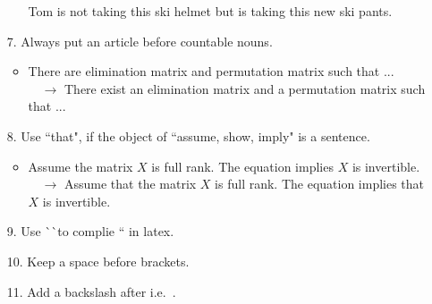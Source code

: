 \documentclass[11pt]{article}
\theoremstyle{plain}
\theoremstyle{definition}
\begin{document}
\begin{enumerate}
\begin{itemize}
    	Tom is not taking this ski helmet but is taking this new ski pants.
    \end{itemize}
    \item[7.] Always put an article before countable nouns. 
    \begin{itemize}
    	\item There are elimination matrix and permutation matrix such that ...\\
    	$\quad \rightarrow $ There exist an elimination matrix and a permutation matrix such that ...
    \end{itemize}
    \item[8.] Use ``that", if the object of ``assume, show, imply" is a sentence.
    \begin{itemize}
    	\item Assume the matrix $X$ is full rank. The equation implies $X$ is invertible.\\
    	$\quad \rightarrow $ Assume that the matrix $X$ is full rank. The equation implies that $X$ is invertible.
    \end{itemize}
    \item[9.] Use \`\ \`\ to complie `` in latex.
    \item[10.] Keep a space before brackets.
    \item[11.] Add a backslash after i.e.\ . 
\end{enumerate}
\end{document}

